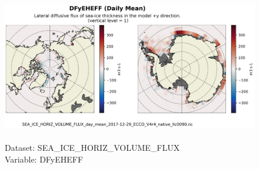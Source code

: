 \begin{figure}[H]
\centering
\includegraphics[scale=0.5]{../images/plots/native_plots/Sea-Ice_and_Snow_Horizontal_Volume_Fluxes/DFyEHEFF.png}
\caption{\\Dataset: SEA\_ICE\_HORIZ\_VOLUME\_FLUX\\Variable: DFyEHEFF}
\label{tab:table-SEA_ICE_HORIZ_VOLUME_FLUX_DFyEHEFF-Plot}
\end{figure}
\pagebreak
